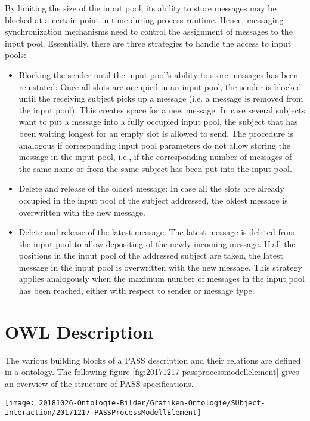 By limiting the size of the input pool, its ability to store messages may be blocked at a certain point in time during process runtime. Hence, messaging synchronization mechanisms need to control the assignment of messages to the input pool. Essentially, there are three strategies to handle the access to input pools:
\begin{itemize}
	\item Blocking the sender until the input pool’s ability to store messages has been reinstated: Once all slots are occupied in an input pool, the sender is blocked until the receiving subject picks up a message (i.e. a message is removed from the input pool). This creates space for a new message. In case several subjects want to put a message into a fully occupied input pool, the subject that has been waiting longest for an empty slot is allowed to send. The procedure is analogous if corresponding input pool parameters do not allow storing the message in the input pool, i.e., if the corresponding number of messages of the same name or from the same subject has been put into the input pool.
	\item Delete and release of the oldest message: In case all the slots are already occupied in the input pool of the subject addressed, the oldest message is overwritten with the new message.
	\item Delete and release of the latest message: The latest message is deleted from the input pool to allow depositing of the newly incoming message. If all the positions in the input pool of the addressed subject are taken, the latest message in the input pool is overwritten with the new message. This strategy applies analogously when the maximum number of messages in the input pool has been reached, either with respect to sender or message type.
\end{itemize}

\newpage

\section{OWL Description}
\label{OWL-DescriptionSID}

The various building blocks of a PASS description and their relations are defined in a ontology. The following figure \ref{fig:20171217-passprocessmodellelement} gives an overview of the structure of PASS specifications.   

\begin{figure*}[ph]
	\centering
	\texttt{[image: 20181026-Ontologie-Bilder/Grafiken-Ontologie/SUbject-Interaction/20171217-PASSProcessModellElement]}
	\caption[Elements of PASS Process Models]{Elements of PASS Process Models}
	\label{fig:20171217-passprocessmodellelement}
\end{figure*}

